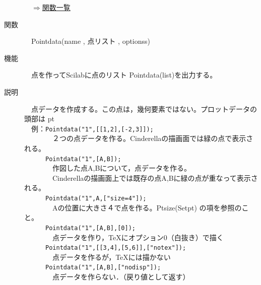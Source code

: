 \documentclass[papersize,a4paper,12pt,uplatex]{jsarticle}
\begin{document}
\begin{description}
\begin{flushright}　\hyperlink{functionlist}{$\Rightarrow$関数一覧}\end{flushright}

\hypertarget{pointdata}{}
\item[関数]　Pointdata(name , 点リスト , optionss)
\item[機能]　点を作ってScilabに点のリスト Pointdata(list)を出力する。
\item[説明]　点データを作成する。この点は，幾何要素ではない。プロットデータの頭部は pt\\
　例：\verb|Pointdata("1",[[1,2],[-2,3]]);|\\
　　　　２つの点データを作る。Cinderellaの描画面では緑の点で表示される。\\
　　　\verb|Pointdata("1",[A,B]);|\\
　　　　作図した点A,Bについて，点データを作る。\\
　　　　Cinderellaの描画面上では既存の点A,Bに緑の点が重なって表示される。\\
　　　\verb|Pointdata("1",A,["size=4"]);|\\
　　　　Aの位置に大きさ４で点を作る。Ptsize(Setpt) の項を参照のこと。\\
　　　\verb|Pointdata("1",[A,B],[0]);|\\
　　　　点データを作り，TeXにオプション0（白抜き）で描く\\
　　　\verb|Pointdata("1",[[3,4],[5,6]],["notex"]);|\\
　　　　点データを作るが，TeXには描かない\\
　　　\verb|Pointdata("1",[A,B],["nodisp"]);|\\
　　　　点データを作らない．（戻り値として返す）\\
 

\end{description}
\end{document}
